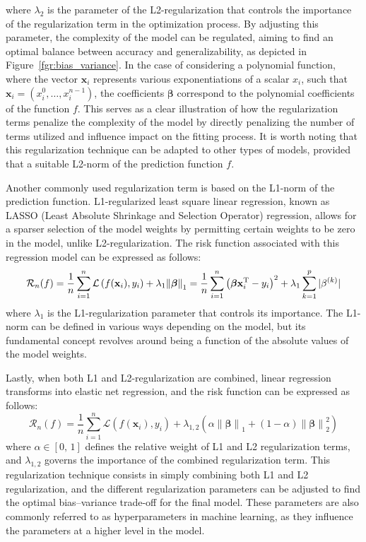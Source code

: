 \documentclass[main]{subfiles}
\begin{document}
where $\lambda_2$ is the parameter of the L2-regularization that controls the importance of the regularization term in the optimization process. By adjusting this parameter, the complexity of the model can be regulated, aiming to find an optimal balance between accuracy and generalizability, as depicted in Figure~\ref{fgr:bias_variance}. In the case of considering a polynomial function, where the vector $\mathbf{x}_i$ represents various exponentiations of a scalar $x_i$, such that $\mathbf{x}_i=\left(x_i^0,\ldots,x_i^{n-1}\right)$, the coefficients $\boldsymbol{\beta}$ correspond to the polynomial coefficients of the function $f$. This serves as a clear illustration of how the regularization terms penalize the complexity of the model by directly penalizing the number of terms utilized and influence impact on the fitting process. It is worth noting that this regularization technique can be adapted to other types of models, provided that a suitable L2-norm of the prediction function $f$.

Another commonly used regularization term is based on the L1-norm of the prediction function. L1-regularized least square linear regression, known as LASSO (Least Absolute Shrinkage and Selection Operator) regression, allows for a sparser selection of the model weights by permitting certain weights to be zero in the model, unlike L2-regularization. The risk function associated with this regression model can be expressed as follows:
\begin{equation}\label{eq:L1_reg}
  \mathcal{R}_n(f) = \frac{1}{n}\sum_{i=1}^n \mathcal{L}\left(f(\mathbf{x}_i),y_i\right) + \lambda_1{\lVert \boldsymbol{\beta} \rVert}_1 = \frac{1}{n}\sum_{i=1}^n {\left(\boldsymbol{\beta}\mathbf{x}_i^{\text{T}}-y_i\right)}^2 + \lambda_1 \sum_{k=1}^p |\beta^{(k)}|
\end{equation}
where $\lambda_1$ is the L1-regularization parameter that controls its importance. The L1-norm can be defined in various ways depending on the model, but its fundamental concept revolves around being a function of the absolute values of the model weights.

Lastly, when both L1 and L2-regularization are combined, linear regression transforms into elastic net regression, and the risk function can be expressed as follows:
\begin{equation}\label{eq:elasticnet_reg}
  \mathcal{R}_n(f) = \frac{1}{n}\sum_{i=1}^n \mathcal{L}\left(f(\mathbf{x}_i),y_i\right) + \lambda_{1,2} \left({\alpha \lVert \boldsymbol{\beta} \rVert }_1 + (1-\alpha) {\lVert \boldsymbol{\beta} \rVert}_2^2\right)
\end{equation}
where $\alpha\in[0,\,1]$ defines the relative weight of L1 and L2 regularization terms, and $\lambda_{1,2}$ governs the importance of the combined regularization term. This regularization technique consists in simply combining both L1 and L2 regularization, and the different regularization parameters can be adjusted to find the optimal bias--variance trade-off for the final model. These parameters are also commonly referred to as hyperparameters in machine learning, as they influence the parameters at a higher level in the model.
\end{document}
